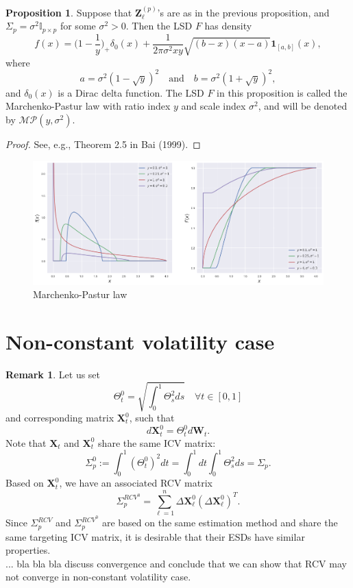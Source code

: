 \documentclass[a4paper,11pt]{article}
\theoremstyle{plain}
\theoremstyle{definition}
\newtheorem{rmrk}[thm]{Remark}
\newtheorem{prps}[thm]{Proposition}
\begin{document}
	\begin{prps}
		Suppose that $\mathbf{Z}_\ell^{(p)}$'s are as in the previous proposition, and $\Sigma_p = \sigma^2 \mathbb{I}_{p \times p}$ for some $\sigma^2>0$. Then the LSD $F$ has density
		\[ f(x) = \Big(1-\frac{1}{y}\Big)_+\delta_0(x) + \frac{1}{2 \pi \sigma^2 xy} \sqrt{(b-x)(x-a)} \mathbf{1}_{[a,b]}(x), \]
		where 
		\[ a = \sigma^2(1-\sqrt{y})^2 \quad \text{and} \quad b = \sigma^2(1+\sqrt{y})^2, \]
		and $\delta_0(x)$ is a Dirac delta function. The LSD $F$ in this proposition is called the Marchenko-Pastur law with ratio index $y$ and scale index $\sigma^2$, and will be denoted by $\mathcal{MP}(y, \sigma^2)$.
	\end{prps}
	\begin{proof}
		See, e.g., Theorem 2.5 in Bai (1999).
	\end{proof}
	\begin{figure}
		\begin{center} \centering
			\includegraphics[scale=0.4]{MP}
			\caption{Marchenko-Pastur law}
		\end{center}
	\end{figure}
	
	\section*{Non-constant volatility case}
	\begin{rmrk}
		Let us set
		\[ \Theta_t^0 = \sqrt{\int_0^1\Theta_s^2 ds} \quad \forall t \in [0, 1] \]
		and corresponding matrix $\mathbf{X}_t^0$, such that
		\[ d\mathbf{X}_t^0 = \Theta_t^0d\mathbf{W}_t. \]
		Note that $\mathbf{X}_t$ and $\mathbf{X}_t^0$ share the same ICV matrix:
		\[ \Sigma_p^0 :=  \int_0^1(\Theta_t^0)^2 dt = \int_0^1 dt \int_0^1 \Theta_s^2 ds = \Sigma_p.  \]
		Based on $\mathbf{X}_t^0$, we have an associated RCV matrix
		\[ \Sigma_p^{RCV^0} = \sum_{\ell=1}^{n} \Delta \mathbf{X}_\ell^0 (\Delta \mathbf{X}_\ell^0)^T. \]
		Since $\Sigma_p^{RCV}$ and $\Sigma_p^{RCV^0}$ are based on the same estimation method and share the same targeting ICV matrix, it is desirable that their ESDs have similar properties. \\
		... bla bla bla discuss convergence and conclude that we can show that RCV may not converge in non-constant volatility case.
	\end{rmrk}
	
\end{document}
